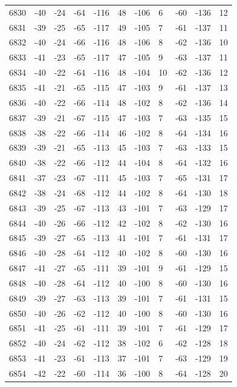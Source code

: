 \begin{table}[H]
\begin{tabular}{lllllllllll}
6830 & -40 & -24 & -64 & -116 & 48 & -106 & 6 & -60 & -136 & 12 \\
6831 & -39 & -25 & -65 & -117 & 49 & -105 & 7 & -61 & -137 & 11 \\
6832 & -40 & -24 & -66 & -116 & 48 & -106 & 8 & -62 & -136 & 10 \\
6833 & -41 & -23 & -65 & -117 & 47 & -105 & 9 & -63 & -137 & 11 \\
6834 & -40 & -22 & -64 & -116 & 48 & -104 & 10 & -62 & -136 & 12 \\
6835 & -41 & -21 & -65 & -115 & 47 & -103 & 9 & -61 & -137 & 13 \\
6836 & -40 & -22 & -66 & -114 & 48 & -102 & 8 & -62 & -136 & 14 \\
6837 & -39 & -21 & -67 & -115 & 47 & -103 & 7 & -63 & -135 & 15 \\
6838 & -38 & -22 & -66 & -114 & 46 & -102 & 8 & -64 & -134 & 16 \\
6839 & -39 & -21 & -65 & -113 & 45 & -103 & 7 & -63 & -133 & 15 \\
6840 & -38 & -22 & -66 & -112 & 44 & -104 & 8 & -64 & -132 & 16 \\
6841 & -37 & -23 & -67 & -111 & 45 & -103 & 7 & -65 & -131 & 17 \\
6842 & -38 & -24 & -68 & -112 & 44 & -102 & 8 & -64 & -130 & 18 \\
6843 & -39 & -25 & -67 & -113 & 43 & -101 & 7 & -63 & -129 & 17 \\
6844 & -40 & -26 & -66 & -112 & 42 & -102 & 8 & -62 & -130 & 16 \\
6845 & -39 & -27 & -65 & -113 & 41 & -101 & 7 & -61 & -131 & 17 \\
6846 & -40 & -28 & -64 & -112 & 40 & -102 & 8 & -60 & -130 & 16 \\
6847 & -41 & -27 & -65 & -111 & 39 & -101 & 9 & -61 & -129 & 15 \\
6848 & -40 & -28 & -64 & -112 & 40 & -100 & 8 & -60 & -130 & 16 \\
6849 & -39 & -27 & -63 & -113 & 39 & -101 & 7 & -61 & -131 & 15 \\
6850 & -40 & -26 & -62 & -112 & 40 & -100 & 8 & -60 & -130 & 16 \\
6851 & -41 & -25 & -61 & -111 & 39 & -101 & 7 & -61 & -129 & 17 \\
6852 & -40 & -24 & -62 & -112 & 38 & -102 & 6 & -62 & -128 & 18 \\
6853 & -41 & -23 & -61 & -113 & 37 & -101 & 7 & -63 & -129 & 19 \\
6854 & -42 & -22 & -60 & -114 & 36 & -100 & 8 & -64 & -128 & 20 \\

\end{tabular}
\end{table}
